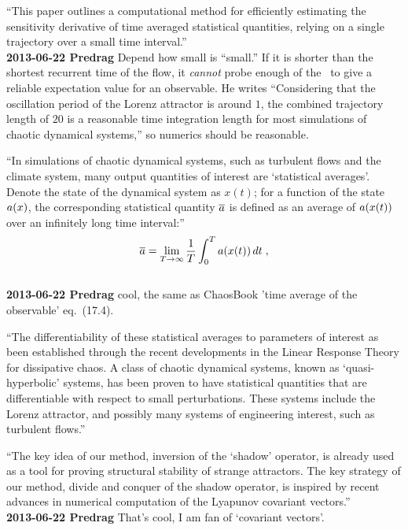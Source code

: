 \begin{description}
``This paper outlines a computational method for efficiently
estimating the sensitivity derivative of time averaged statistical
quantities, relying on a single trajectory over a small time interval.''
\\
{\bf 2013-06-22 Predrag} Depend how small is ``small.'' If it is
shorter than the shortest recurrent time of the flow, it
\emph{cannot} probe enough of the \statesp\ to give a reliable
expectation value for an observable. He writes ``Considering that the
oscillation period of the Lorenz attractor is around $1$, the
combined trajectory length of $20$ is a reasonable time integration
length for most simulations of chaotic dynamical systems,'' so
numerics should be reasonable.

``In simulations of chaotic dynamical systems, such as turbulent flows and
the climate system, many output quantities of interest are
                                \toCB
`statistical
averages'.  Denote the state of the dynamical system as $x(t)$;
for a function of the state $a(x)$,
the corresponding statistical quantity $\overline{a}$ is defined
as an average of $a(x(t))$ over an infinitely long time interval:''
\begin{equation} \label{Wang13:stats}
\overline{a} = \lim_{T\rightarrow\infty}
\frac1T \int_0^T a(x(t))\,dt\;,
\end{equation}
\\
{\bf 2013-06-22 Predrag} cool, the same as ChaosBook 'time average of
the observable' eq.~(17.4).

``The differentiability of these statistical averages to parameters
of interest as been established through the recent developments in
the Linear Response Theory for dissipative
chaos. A class of chaotic dynamical systems,
known as `quasi-hyperbolic' systems, has been proven to have
statistical quantities that are differentiable with respect to small
perturbations.  These systems include the Lorenz attractor, and
possibly many systems of engineering interest, such as turbulent
flows.''

``The key idea of our method, inversion of the `shadow' operator, is
already used as a tool for proving structural stability of strange
attractors. The key strategy of our method, divide and
conquer of the shadow operator, is inspired by recent advances in
numerical computation of the Lyapunov covariant
vectors.''
\\
{\bf 2013-06-22 Predrag} That's cool, I am fan of `covariant vectors'.


\end{description}
